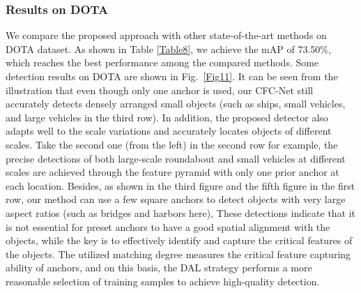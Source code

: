 \documentclass[journal]{IEEEtran}
\begin{document}
\begin{table}[t]
	\renewcommand\arraystretch{1.2}
	\centering	
	\caption{Detection results on UCAS-AOD dataset.}
	\label{Table8}
\end{table}





\subsubsection{Results on DOTA}
We compare the proposed approach with other state-of-the-art methods on DOTA dataset. As shown in Table \ref{Table8}, we achieve the mAP of 73.50\%, which reaches the best performance among the compared  methods. Some detection results on DOTA are shown in Fig.~\ref{Fig11}. It can be seen from the illustration that even though only one anchor is used, our CFC-Net still accurately detects densely arranged small objects (such as ships, small vehicles, and large vehicles in the third row). In addition, the proposed detector also adapts well to the scale variations and accurately locates objects of different scales. Take the second one (from the left) in the second row for example, the precise detections of both large-scale roundabout and small vehicles at different scales are achieved through the feature pyramid with only one prior anchor at each location. Besides, as shown in the third figure and the fifth figure in the first row, our method can use a few square anchors to detect objects with very large aspect ratios (such as bridges and harbors here), These detections indicate that it is not essential for preset anchors to have a good spatial alignment with the objects, while the key is to effectively identify and capture the critical features of the objects. The utilized matching degree measures the critical feature capturing ability of anchors, and on this basis, the DAL strategy performs a more reasonable selection of training samples to achieve high-quality detection.
\end{document}
